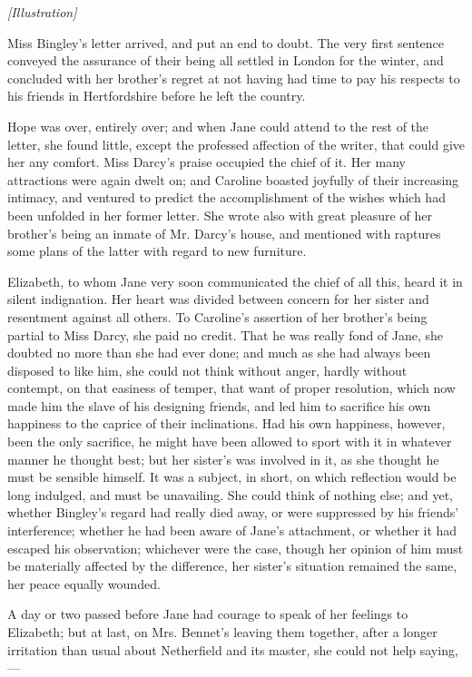 \documentclass[12pt]{book}
\begin{document}
\emph{[Illustration]}

Miss Bingley's letter arrived, and put an end to doubt. The very first sentence conveyed the assurance of their being all settled in London for the winter, and concluded with her brother's regret at not having had time to pay his respects to his friends in Hertfordshire before he left the country.

Hope was over, entirely over; and when Jane could attend to the rest of the letter, she found little, except the professed affection of the writer, that could give her any comfort. Miss Darcy's praise occupied the chief of it. Her many attractions were again dwelt on; and Caroline boasted joyfully of their increasing intimacy, and ventured to predict the accomplishment of the wishes which had been unfolded in her former letter. She wrote also with great pleasure of her brother's being an inmate of Mr. Darcy's house, and mentioned with raptures some plans of the latter with regard to new furniture.

Elizabeth, to whom Jane very soon communicated the chief of all this, heard it in silent indignation. Her heart was divided between concern for her sister and resentment against all others. To Caroline's assertion of her brother's being partial to Miss Darcy, she paid no credit. That he was really fond of Jane, she doubted no more than she had ever done; and much as she had always been disposed to like him, she could not think without anger, hardly without contempt, on that easiness of temper, that want of proper resolution, which now made him the slave of his designing friends, and led him to sacrifice his own happiness to the caprice of their inclinations. Had his own happiness, however, been the only sacrifice, he might have been allowed to sport with it in whatever manner he thought best; but her sister's was involved in it, as she thought he must be sensible himself. It was a subject, in short, on which reflection would be long indulged, and must be unavailing. She could think of nothing else; and yet, whether Bingley's regard had really died away, or were suppressed by his friends' interference; whether he had been aware of Jane's attachment, or whether it had escaped his observation; whichever were the case, though her opinion of him must be materially affected by the difference, her sister's situation remained the same, her peace equally wounded.

A day or two passed before Jane had courage to speak of her feelings to Elizabeth; but at last, on Mrs. Bennet's leaving them together, after a longer irritation than usual about Netherfield and its master, she could not help saying,---
\end{document}
